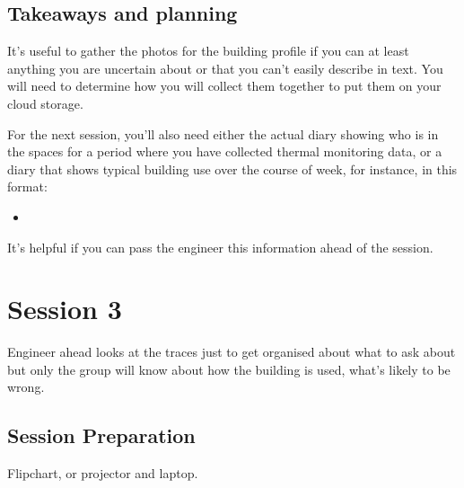 \documentclass[letterpaper,10pt,english]{jupyterBook}
\begin{document}
\sphinxstepscope


\section{Takeaways and planning}
\label{\detokenize{session2/details/takeaways-and-planning:takeaways-and-planning}}\label{\detokenize{session2/details/takeaways-and-planning::doc}}
\sphinxAtStartPar
It’s useful to gather the photos for the building profile if you can \sphinxhyphen{} at least anything you are uncertain about or that you can’t easily describe in text.  You will need to determine how you will collect them together to put them on your cloud storage.

\sphinxAtStartPar
For the next session, you’ll also need either the actual diary showing who is in the spaces for a period where you have collected thermal monitoring data, or a diary that shows typical building use over the course of week, for instance, in this format:
\begin{itemize}
\item {} 
\sphinxAtStartPar
{}

\end{itemize}

\sphinxAtStartPar
It’s helpful if you can pass the engineer this information ahead of the session.



\sphinxstepscope


\chapter{Session 3}
\label{\detokenize{session3/session3:session-3}}\label{\detokenize{session3/session3::doc}}
\sphinxAtStartPar
Engineer ahead looks at the traces just to get organised about what to ask about \sphinxhyphen{} but only the group will know about how the building is used, what’s likely to be wrong.

\sphinxstepscope


\section{Session Preparation}
\label{\detokenize{session3/details/preparation:session-preparation}}\label{\detokenize{session3/details/preparation::doc}}
\sphinxAtStartPar
Flipchart, or projector and laptop.
\end{document}

